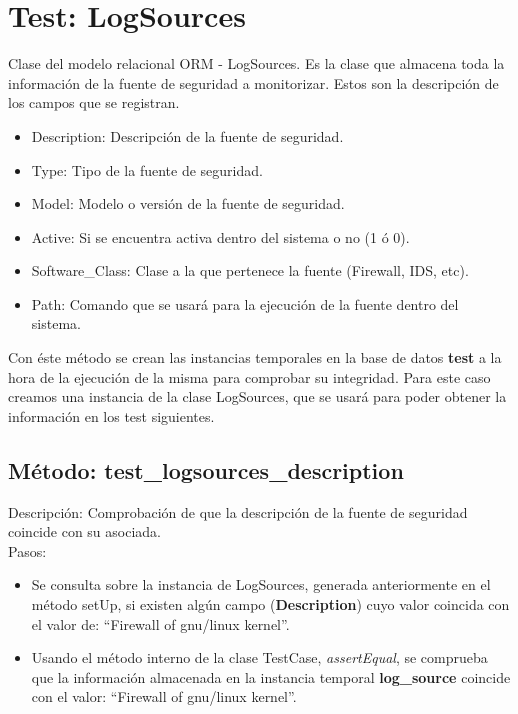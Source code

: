 

\section{\quad Test: LogSources}

Clase del modelo relacional ORM - LogSources. Es la clase que almacena toda la información de la fuente de seguridad a monitorizar. Estos son la descripción de los campos que se registran.\\

\begin{itemize}
\item Description: Descripción de la fuente de seguridad.
\item Type: Tipo de la fuente de seguridad.
\item Model: Modelo o versión de la fuente de seguridad.
\item Active: Si se encuentra activa dentro del sistema o no (1 ó 0).
\item Software\_Class: Clase a la que pertenece la fuente (Firewall, IDS, etc).
\item Path: Comando que se usará para la ejecución de la fuente dentro del sistema.
\end{itemize}

Con éste método se crean las instancias temporales en la base de datos \textbf{test} a la hora de la ejecución de la misma para comprobar su integridad. Para este caso creamos una instancia de la clase LogSources, que se usará para poder obtener la información en los test siguientes.\\



\subsection{\quad Método: test\_logsources\_description}

Descripción: Comprobación de que la descripción de la fuente de seguridad coincide con su asociada.\\
Pasos:
\begin{itemize}
\item Se consulta sobre la instancia de LogSources, generada anteriormente en el método setUp, si existen algún campo (\textbf{Description}) cuyo valor coincida con el valor de: ``Firewall of gnu/linux kernel''.
\item Usando el método interno de la clase TestCase, \emph{assertEqual}, se comprueba que la información almacenada en la instancia temporal \textbf{log\_source} coincide con el valor: ``Firewall of gnu/linux kernel''.
\end{itemize}


